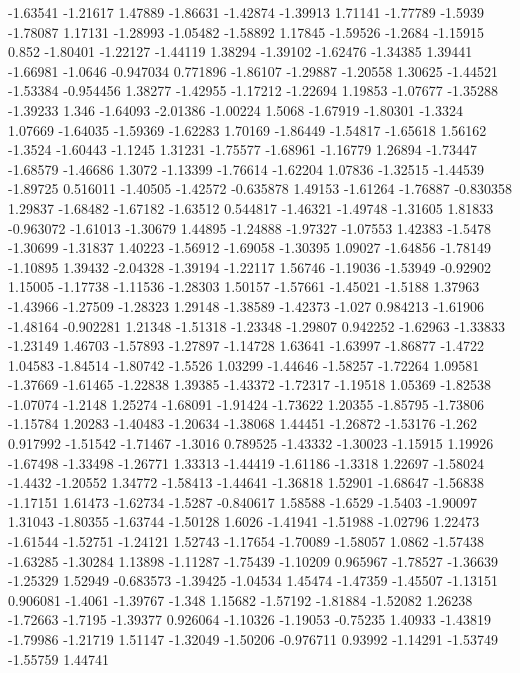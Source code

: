 \documentclass[9pt]{article}
\theoremstyle{plain}
\theoremstyle{definition}
\theoremstyle{remark}
\numberwithin{equation}{section}
\begin{document}
-1.63541
-1.21617
1.47889
-1.86631
-1.42874
-1.39913
1.71141
-1.77789
-1.5939
-1.78087
1.17131
-1.28993
-1.05482
-1.58892
1.17845
-1.59526
-1.2684
-1.15915
0.852
-1.80401
-1.22127
-1.44119
1.38294
-1.39102
-1.62476
-1.34385
1.39441
-1.66981
-1.0646
-0.947034
0.771896
-1.86107
-1.29887
-1.20558
1.30625
-1.44521
-1.53384
-0.954456
1.38277
-1.42955
-1.17212
-1.22694
1.19853
-1.07677
-1.35288
-1.39233
1.346
-1.64093
-2.01386
-1.00224
1.5068
-1.67919
-1.80301
-1.3324
1.07669
-1.64035
-1.59369
-1.62283
1.70169
-1.86449
-1.54817
-1.65618
1.56162
-1.3524
-1.60443
-1.1245
1.31231
-1.75577
-1.68961
-1.16779
1.26894
-1.73447
-1.68579
-1.46686
1.3072
-1.13399
-1.76614
-1.62204
1.07836
-1.32515
-1.44539
-1.89725
0.516011
-1.40505
-1.42572
-0.635878
1.49153
-1.61264
-1.76887
-0.830358
1.29837
-1.68482
-1.67182
-1.63512
0.544817
-1.46321
-1.49748
-1.31605
1.81833
-0.963072
-1.61013
-1.30679
1.44895
-1.24888
-1.97327
-1.07553
1.42383
-1.5478
-1.30699
-1.31837
1.40223
-1.56912
-1.69058
-1.30395
1.09027
-1.64856
-1.78149
-1.10895
1.39432
-2.04328
-1.39194
-1.22117
1.56746
-1.19036
-1.53949
-0.92902
1.15005
-1.17738
-1.11536
-1.28303
1.50157
-1.57661
-1.45021
-1.5188
1.37963
-1.43966
-1.27509
-1.28323
1.29148
-1.38589
-1.42373
-1.027
0.984213
-1.61906
-1.48164
-0.902281
1.21348
-1.51318
-1.23348
-1.29807
0.942252
-1.62963
-1.33833
-1.23149
1.46703
-1.57893
-1.27897
-1.14728
1.63641
-1.63997
-1.86877
-1.4722
1.04583
-1.84514
-1.80742
-1.5526
1.03299
-1.44646
-1.58257
-1.72264
1.09581
-1.37669
-1.61465
-1.22838
1.39385
-1.43372
-1.72317
-1.19518
1.05369
-1.82538
-1.07074
-1.2148
1.25274
-1.68091
-1.91424
-1.73622
1.20355
-1.85795
-1.73806
-1.15784
1.20283
-1.40483
-1.20634
-1.38068
1.44451
-1.26872
-1.53176
-1.262
0.917992
-1.51542
-1.71467
-1.3016
0.789525
-1.43332
-1.30023
-1.15915
1.19926
-1.67498
-1.33498
-1.26771
1.33313
-1.44419
-1.61186
-1.3318
1.22697
-1.58024
-1.4432
-1.20552
1.34772
-1.58413
-1.44641
-1.36818
1.52901
-1.68647
-1.56838
-1.17151
1.61473
-1.62734
-1.5287
-0.840617
1.58588
-1.6529
-1.5403
-1.90097
1.31043
-1.80355
-1.63744
-1.50128
1.6026
-1.41941
-1.51988
-1.02796
1.22473
-1.61544
-1.52751
-1.24121
1.52743
-1.17654
-1.70089
-1.58057
1.0862
-1.57438
-1.63285
-1.30284
1.13898
-1.11287
-1.75439
-1.10209
0.965967
-1.78527
-1.36639
-1.25329
1.52949
-0.683573
-1.39425
-1.04534
1.45474
-1.47359
-1.45507
-1.13151
0.906081
-1.4061
-1.39767
-1.348
1.15682
-1.57192
-1.81884
-1.52082
1.26238
-1.72663
-1.7195
-1.39377
0.926064
-1.10326
-1.19053
-0.75235
1.40933
-1.43819
-1.79986
-1.21719
1.51147
-1.32049
-1.50206
-0.976711
0.93992
-1.14291
-1.53749
-1.55759
1.44741
\end{document}
